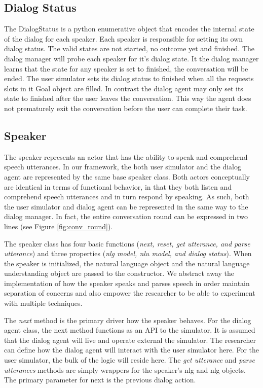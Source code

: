 \subsection{Dialog Status}

The DialogStatus is a python enumerative object that encodes the internal state of the dialog for each speaker. Each speaker is responsible for setting its own dialog status. The valid states are not started, no outcome yet and finished. The dialog manager will probe each speaker for it's dialog state. It the dialog manager learns that the state for any speaker is set to finished, the conversation will be ended. The user simulator sets its dialog status to finished when all the requests slots in it Goal object are filled. In contrast the dialog agent may only set its state to finished after the user leaves the conversation. This way the agent does not prematurely exit the conversation before the user can complete their task. 

\subsection{Speaker}

The speaker represents an actor that has the ability to speak and comprehend speech utterances. In our framework, the both user simulator and the dialog agent are represented by the same base speaker class. Both actors conceptually are identical in terms of functional behavior, in that they both listen and comprehend speech utterances and in turn respond by speaking. As such, both the user simulator and dialog agent can be represented in the same way to the dialog manager. In fact, the entire conversation round can be expressed in two lines (see Figure \ref{fig:conv_round}).

The speaker class has four basic functions (\textit{next, reset, get utterance, and parse utterance}) and three properties (\textit{nlg model, nlu model, and dialog status}). When the speaker is initialized, the natural language object and the natural language understanding object are passed to the constructor. We abstract away the implementation of how the speaker speaks and parses speech in order maintain separation of concerns and also empower the researcher to be able to experiment with multiple techniques. 

The \textit{next} method is the primary driver how the speaker behaves. For the dialog agent class, the next method functions as an API to the simulator. It is assumed that the dialog agent will live and operate external the simulator. The researcher can define how the dialog agent will interact with the user simulator here. For the user simulator, the bulk of the logic will reside here. The \textit{get utterance} and \textit{parse utterances} methods are simply wrappers for the speaker's nlg and nlg objects. The primary parameter for next is the previous dialog action. 

